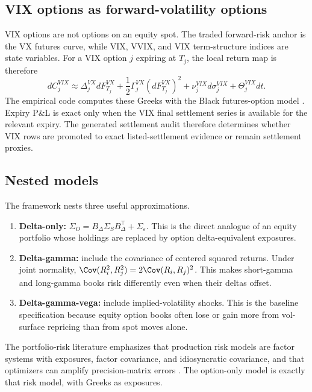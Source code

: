 \subsection{VIX options as forward-volatility options}

VIX options are not options on an equity spot. The traded forward-risk anchor is the VX
futures curve, while VIX, VVIX, and VIX term-structure indices are state variables. For a
VIX option $j$ expiring at $T_j$, the local return map is therefore
\begin{equation}
 dC^{VIX}_j
 \approx
 \Delta^{VX}_j dF^{VX}_{T_j}
 +\frac12\Gamma^{VX}_j(dF^{VX}_{T_j})^2
 +\nu^{VIX}_j d\sigma^{VIX}_j
 +\Theta^{VIX}_jdt.
\label{eq:vix_forward_map}
\end{equation}
The empirical code computes these Greeks with the Black futures-option model
\citep{black1976commodity}. Expiry P\&L is exact only when the VIX final settlement series
is available for the relevant expiry. The generated settlement audit therefore determines
whether VIX rows are promoted to exact listed-settlement evidence or remain settlement
proxies.

\subsection{Nested models}

The framework nests three useful approximations.
\begin{enumerate}[leftmargin=2em]
  \item \textbf{Delta-only:}
  $\Sigma_O=B_\Delta\Sigma_S B_\Delta^\top+\Sigma_\varepsilon$.
  This is the direct analogue of an equity portfolio whose holdings are
  replaced by option delta-equivalent exposures.
  \item \textbf{Delta-gamma:}
  include the covariance of centered squared returns.  Under joint
  normality,
  $\Cov(R_i^2,R_j^2)=2\Cov(R_i,R_j)^2$.  This makes short-gamma and
  long-gamma books risk differently even when their deltas offset.
  \item \textbf{Delta-gamma-vega:}
  include implied-volatility shocks.  This is the baseline specification
  because equity option books often lose or gain more from vol-surface
  repricing than from spot moves alone.
\end{enumerate}

The portfolio-risk literature emphasizes that production risk models are
factor systems with exposures, factor covariance, and idiosyncratic
covariance, and that optimizers can amplify precision-matrix errors
\citep{ledoitwolf2004}. The option-only model is exactly that risk
model, with Greeks as exposures.
